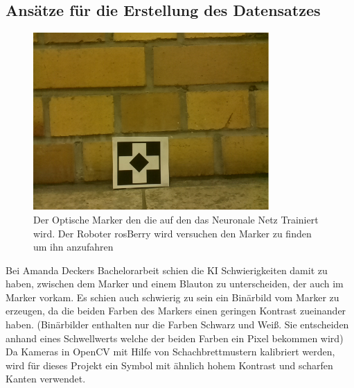 \documentclass[conference]{IEEEtran}
\begin{document}
	\subsection{Ansätze für die Erstellung des Datensatzes}	%
	\begin{figure} [!h]
		\centering
		\includegraphics[width=9cm]{img/data1455211246.png}
		\caption{Der Optische Marker den die auf den das Neuronale Netz 
		Trainiert wird. Der Roboter rosBerry wird versuchen den Marker zu 
		finden um ihn anzufahren}
		\label{Marker}
	\end{figure}
	
	Bei Amanda Deckers Bachelorarbeit \cite{Amanda} schien die KI 
	Schwierigkeiten damit zu haben, zwischen dem Marker und einem Blauton 
	zu unterscheiden, der auch im Marker vorkam.
	Es schien auch schwierig zu sein ein Binärbild vom Marker zu erzeugen, 
	da die beiden Farben des Markers einen geringen Kontrast zueinander 
	haben. (Binärbilder enthalten nur die Farben Schwarz und Weiß. Sie 
	entscheiden anhand eines Schwellwerts welche der beiden Farben ein 
	Pixel bekommen wird)
	Da Kameras in OpenCV mit Hilfe von Schachbrettmustern kalibriert werden, wird für dieses Projekt ein Symbol mit ähnlich hohem Kontrast und scharfen Kanten verwendet.
	\\
	
\end{document}
